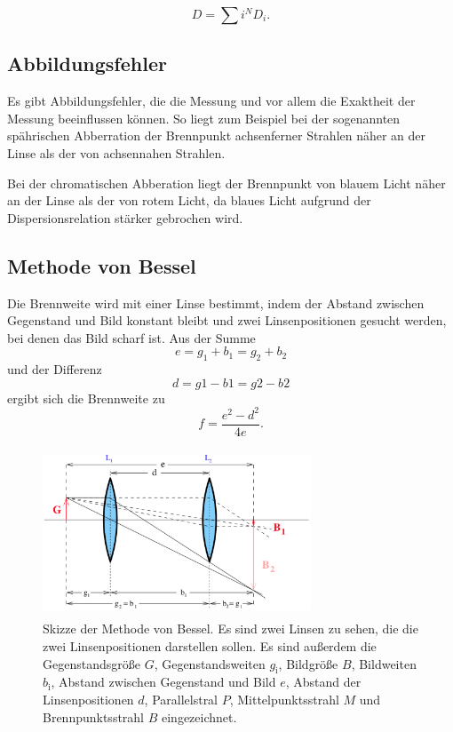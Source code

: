 \begin{equation*}
    D= \sum{i}^N D_i.
    \label{eqn:brechungskraft}
\end{equation*}


\subsection{Abbildungsfehler}
Es gibt Abbildungsfehler, die die Messung und vor allem die Exaktheit der Messung beeinflussen können. So liegt zum Beispiel bei der sogenannten spährischen Abberration der Brennpunkt achsenferner Strahlen näher an der Linse als der von achsennahen Strahlen. 

\noindent Bei der chromatischen Abberation liegt der Brennpunkt von blauem Licht näher an der Linse als der von rotem Licht, da blaues Licht aufgrund der Dispersionsrelation stärker gebrochen wird.  


\subsection{Methode von Bessel}
Die Brennweite wird mit einer Linse bestimmt, indem der Abstand zwischen Gegenstand und Bild konstant bleibt und zwei Linsenpositionen gesucht werden, bei denen das Bild scharf ist. Aus der Summe 
\begin{equation}
    e = g_1 + b_1 = g_2 + b_2
    \label{eqn:e}
\end{equation}
und der Differenz 
\begin{equation}
    d = g1- b1 = g2 - b2
    \label{eqn:d}
\end{equation}
ergibt sich die Brennweite zu
\begin{equation}
    f = \frac{e^2 - d^2}{4 e}.
    \label{eqn:fBessel}
\end{equation} 

\begin{figure}
    \centering
    \includegraphics[width=8cm, height=5cm]{build/bessel.png}
    \caption{Skizze der Methode von Bessel. Es sind zwei Linsen zu sehen, die die zwei Linsenpositionen darstellen sollen. Es sind außerdem die Gegenstandsgröße $G$, Gegenstandsweiten $g_\text{i}$, Bildgröße $B$, Bildweiten $b_\text{i}$, Abstand zwischen Gegenstand und Bild $e$, Abstand der Linsenpositionen $d$, Parallelstral $P$, Mittelpunktsstrahl $M$ und Brennpunktsstrahl $B$ eingezeichnet. \cite{V408}}
    \label{fig:abbe}
\end{figure}

